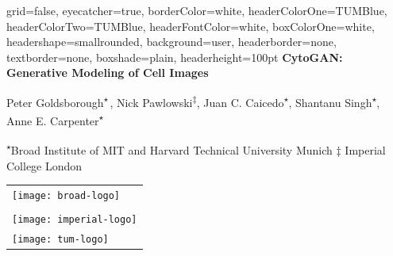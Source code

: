 \documentclass[a0paper,portrait]{baposter}
\newcommand{\aff}{\textsuperscript{$\star$}}
\begin{document}



\begin{poster}{
  grid=false,
  eyecatcher=true,
  borderColor=white,
  headerColorOne=TUMBlue,
  headerColorTwo=TUMBlue,
  headerFontColor=white,
  boxColorOne=white,
  headershape=smallrounded,
  background=user,
  headerborder=none,
  textborder=none,
  boxshade=plain,
  headerheight=100pt
}
{
}
{
  {\bf CytoGAN: Generative Modeling of Cell Images}
  \vspace{3mm}
}
{
  \smaller[0.5]
  \hspace{-3mm}Peter Goldsborough\textsuperscript{$\star$\,\textdagger}, Nick Pawlowski\textsuperscript{$\ddagger$}, Juan C. Caicedo\aff, Shantanu Singh\aff, Anne E. Carpenter\aff

  \vspace{2mm}
  {
    \smaller[1]
    \aff Broad Institute of MIT and Harvard \hspace{3mm}%
    \textdagger\hspace{2pt} Technical University Munich \hspace{3mm}%
    $\ddagger$ Imperial College London
  }
}
{
  \begin{tabular}{l}
    \texttt{[image: broad-logo]}\\
    \vspace{-2mm}\\
    \texttt{[image: imperial-logo]}
    \vspace{-2mm}\\
    \texttt{[image: tum-logo]}\\
  \end{tabular}
}

\end{poster}
\end{document}
